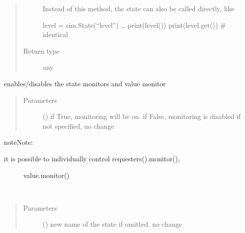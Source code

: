 \documentclass[letterpaper,10pt,english]{sphinxmanual}
\begin{document}
\begin{fulllineitems}
\begin{fulllineitems}
\begin{quote}
\begin{description}
 \textendash{} Instead of this method, the state can also be called directly, like 

level = sim.State(“level”) 
… 
print(level()) 
print(level.get())  \# identical 


\item[{Return type}] \leavevmode
any

\end{description}\end{quote}

\end{fulllineitems}


\begin{fulllineitems}
\label{\detokenize{Reference:salabim.State.monitor}}
enables/disables the state monitors and value monitor
\begin{quote}\begin{description}
\item[{Parameters}] \leavevmode
{} () \textendash{} if True, monitoring will be on. 
if False, monitoring is disabled 
if not specified, no change

\end{description}\end{quote}

\begin{sphinxadmonition}{note}{Note:}\begin{description}
\item[{it is possible to individually control requesters().monitor(),}] \leavevmode
value.monitor()

\end{description}
\end{sphinxadmonition}

\end{fulllineitems}


\begin{fulllineitems}
\label{\detokenize{Reference:salabim.State.name}}~\begin{quote}\begin{description}
\item[{Parameters}] \leavevmode
{} () \textendash{} new name of the state
if omitted, no change


\end{description}
\end{quote}
\end{fulllineitems}
\end{fulllineitems}
\end{document}
